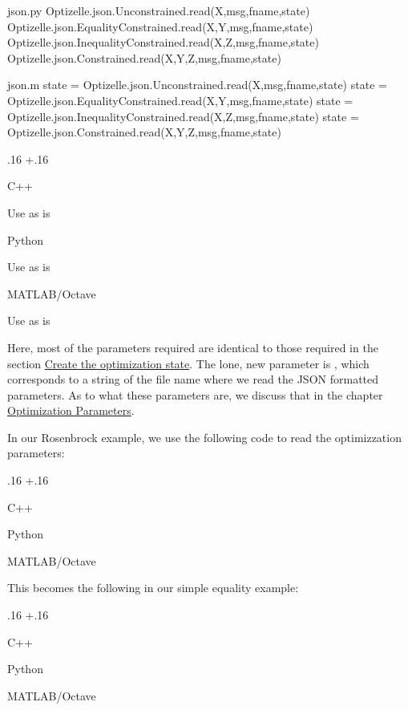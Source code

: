 \documentclass{report}
\makeatletter
\DeclareRobustCommand*{\textct}[1]{%
  \begingroup\@activeus\scantokens{\texttt{#1}\endinput}\endgroup}
\newlength{\gobble}
\newenvironment{boldlist}
    {\begin{list}{}{
        \labelwidth.16\textwidth
        \leftmargin\dimexpr\leftmargin+.16\textwidth
        \renewcommand\makelabel[1]{%
            \textbf{##1}}}}
    {\vspace{-\dimexpr\baselineskip+2\itemsep}\end{list}}
\newcommand{\apiitemshort}[3]{
    \item[Language] #1
    \item[Structure]  #2
    \item[Interface] #3
    \item[]}
\newcommand{\shortexampleitem}[2]{
    \item[Language] #1
    \item[Code]\begin{minipage}[t]{\textwidth}\vspace{\dimexpr-\medskipamount-2ex}#2\end{minipage}
    \item[]}
\newcommand{\secstate}{Create the optimization state}
\newcommand{\chparams}{Optimization Parameters}
\makeatother
\begin{document}
\begin{filecontents*}{json.py}
Optizelle.json.Unconstrained.read(X,msg,fname,state)
Optizelle.json.EqualityConstrained.read(X,Y,msg,fname,state)
Optizelle.json.InequalityConstrained.read(X,Z,msg,fname,state)
Optizelle.json.Constrained.read(X,Y,Z,msg,fname,state)
\end{filecontents*}

\begin{filecontents*}{json.m}
state = Optizelle.json.Unconstrained.read(X,msg,fname,state)
state = Optizelle.json.EqualityConstrained.read(X,Y,msg,fname,state)
state = Optizelle.json.InequalityConstrained.read(X,Z,msg,fname,state)
state = Optizelle.json.Constrained.read(X,Y,Z,msg,fname,state)
\end{filecontents*}

\begin{boldlist}
    \apiitemshort
        {C++}
        {}
        {Use as is}
    \apiitemshort
        {Python}
        {}
        {Use as is}
    \apiitemshort
        {MATLAB/Octave}
        {}
        {Use as is}
\end{boldlist}
Here, most of the parameters required are identical to those required in the section \hyperref[sec:state]{\secstate}.  The lone, new parameter is \textct{fname}, which corresponds to a string of the file name where we read the JSON formatted parameters.  As to what these parameters are, we discuss that in the chapter \hyperref[ch:params]{\chparams}.

        In our Rosenbrock example, we use the following code to read the optimizzation parameters:
\begin{boldlist}
    \shortexampleitem
        {C++}
        {}

    \shortexampleitem
        {Python}
        {}

    \shortexampleitem
        {MATLAB/Octave}
        {}
\end{boldlist}
This becomes the following in our simple equality example: 
\begin{boldlist}
    \shortexampleitem
        {C++}
        {}

    \shortexampleitem
        {Python}
        {}

    \shortexampleitem
        {MATLAB/Octave}
        {}
\end{boldlist}
\end{document}
